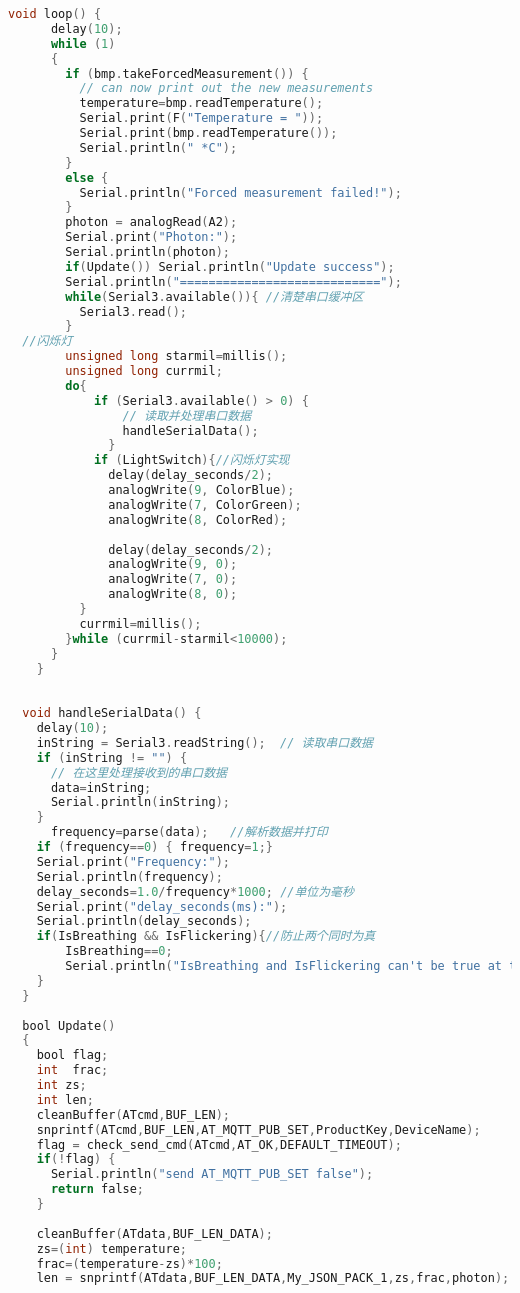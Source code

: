 \documentclass[12pt,hyperref,a4paper,UTF8]{ctexart}
\begin{document}
\begin{lstlisting}[language=C]
  void loop() {
      delay(10);
      while (1)
      {
        if (bmp.takeForcedMeasurement()) {
          // can now print out the new measurements
          temperature=bmp.readTemperature();
          Serial.print(F("Temperature = "));
          Serial.print(bmp.readTemperature());
          Serial.println(" *C");
        } 
        else {
          Serial.println("Forced measurement failed!");
        }
        photon = analogRead(A2);
        Serial.print("Photon:");
        Serial.println(photon);
        if(Update()) Serial.println("Update success");
        Serial.println("============================");
        while(Serial3.available()){ //清楚串口缓冲区
          Serial3.read();
        }
  //闪烁灯
        unsigned long starmil=millis();
        unsigned long currmil;
        do{
            if (Serial3.available() > 0) {
                // 读取并处理串口数据
                handleSerialData();
              }
            if (LightSwitch){//闪烁灯实现
              delay(delay_seconds/2);
              analogWrite(9, ColorBlue);
              analogWrite(7, ColorGreen);
              analogWrite(8, ColorRed);
  
              delay(delay_seconds/2);
              analogWrite(9, 0);
              analogWrite(7, 0);
              analogWrite(8, 0);   
          }
          currmil=millis();
        }while (currmil-starmil<10000);
      }
    }
  
  
  void handleSerialData() {
    delay(10);
    inString = Serial3.readString();  // 读取串口数据
    if (inString != "") {
      // 在这里处理接收到的串口数据
      data=inString;
      Serial.println(inString);
    }
      frequency=parse(data);   //解析数据并打印
    if (frequency==0) { frequency=1;}
    Serial.print("Frequency:");
    Serial.println(frequency);  
    delay_seconds=1.0/frequency*1000; //单位为毫秒
    Serial.print("delay_seconds(ms):");
    Serial.println(delay_seconds);
    if(IsBreathing && IsFlickering){//防止两个同时为真
        IsBreathing==0;
        Serial.println("IsBreathing and IsFlickering can't be true at the same time,set IsBreathing to false");
    }
  }
  
  bool Update()
  {
    bool flag;
    int  frac;
    int zs;
    int len;
    cleanBuffer(ATcmd,BUF_LEN);
    snprintf(ATcmd,BUF_LEN,AT_MQTT_PUB_SET,ProductKey,DeviceName);
    flag = check_send_cmd(ATcmd,AT_OK,DEFAULT_TIMEOUT);
    if(!flag) {
      Serial.println("send AT_MQTT_PUB_SET false");
      return false;
    }
  
    cleanBuffer(ATdata,BUF_LEN_DATA);
    zs=(int) temperature;
    frac=(temperature-zs)*100;
    len = snprintf(ATdata,BUF_LEN_DATA,My_JSON_PACK_1,zs,frac,photon);
  

\end{lstlisting}
\end{document}
